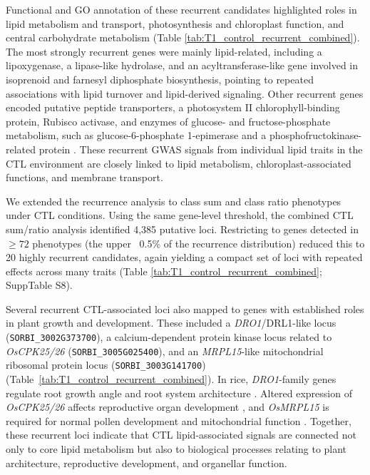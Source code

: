 \documentclass[9pt,twocolumn,twoside]{rilabRxiv}
\begin{document}
Functional and GO annotation of these recurrent candidates highlighted roles in lipid metabolism and transport, photosynthesis and chloroplast function, and central carbohydrate metabolism (Table \ref{tab:T1_control_recurrent_combined}). The most strongly recurrent genes were mainly lipid-related, including a lipoxygenase, a lipase-like hydrolase, and an acyltransferase-like gene involved in isoprenoid and farnesyl diphosphate biosynthesis, pointing to repeated associations with lipid turnover and lipid-derived signaling. Other recurrent genes encoded putative peptide transporters, a photosystem II chlorophyll-binding protein, Rubisco activase, and enzymes of glucose- and fructose-phosphate metabolism, such as glucose-6-phosphate 1-epimerase and a phosphofructokinase-related protein \citep{GeneOntologyConsortium2026}. These recurrent GWAS signals from individual lipid traits in the CTL environment are closely linked to lipid metabolism, chloroplast-associated functions, and membrane transport.

We extended the recurrence analysis to class sum and class ratio phenotypes under CTL conditions. Using the same gene-level threshold, the combined CTL sum/ratio analysis identified 4,385 putative loci. Restricting to genes detected in \(\geq 72\) phenotypes (the upper ~0.5\% of the recurrence distribution) reduced this to 20 highly recurrent candidates, again yielding a compact set of loci with repeated effects across many traits (Table \ref{tab:T1_control_recurrent_combined}; SuppTable S8).

Several recurrent CTL-associated loci also mapped to genes with established roles in plant growth and development. These included a \textit{DRO1}/DRL1-like locus (\texttt{SORBI\_3002G373700}), a calcium-dependent protein kinase locus related to \textit{OsCPK25/26} (\texttt{SORBI\_3005G025400}), and an \textit{MRPL15}-like mitochondrial ribosomal protein locus (\texttt{SORBI\_3003G141700}) (Table~\ref{tab:T1_control_recurrent_combined}). In rice, \textit{DRO1}-family genes regulate root growth angle and root system architecture \citep{Kitomi2020}. Altered expression of \textit{OsCPK25/26} affects reproductive organ development \citep{Zhang2014OsCPK25_26}, and \textit{OsMRPL15} is required for normal pollen development and mitochondrial function \citep{Xie2023OsMRPL15}. Together, these recurrent loci indicate that CTL lipid-associated signals are connected not only to core lipid metabolism but also to biological processes relating to plant architecture, reproductive development, and organellar function.
\end{document}
